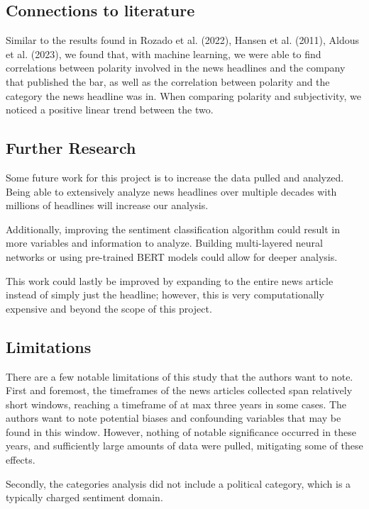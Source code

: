 \documentclass[12pt]{article}
\begin{document}
\subsection{Connections to literature}

Similar to the results found in Rozado et al. (2022), Hansen et al. (2011), Aldous et al. (2023), we found that, with machine learning, we were able to find correlations between polarity involved in the news headlines and the company that published the bar, as well as the correlation between polarity and the category the news headline was in. When comparing polarity and subjectivity, we noticed a positive linear trend between the two.

\subsection{Further Research}

Some future work for this project is to increase the data pulled and analyzed. Being able to extensively analyze news headlines over multiple decades with millions of headlines will increase our analysis.

Additionally, improving the sentiment classification algorithm could result in more variables and information to analyze. Building multi-layered neural networks or using pre-trained BERT models could allow for deeper analysis.

This work could lastly be improved by expanding to the entire news article instead of simply just the headline; however, this is very computationally expensive and beyond the scope of this project. 

\subsection{Limitations}

There are a few notable limitations of this study that the authors want to note. First and foremost, the timeframes of the news articles collected span relatively short windows, reaching a timeframe of at max three years in some cases. The authors want to note potential biases and confounding variables that may be found in this window. However, nothing of notable significance occurred in these years, and sufficiently large amounts of data were pulled, mitigating some of these effects. 

Secondly, the categories analysis did not include a political category, which is a typically charged sentiment domain.
\end{document}
